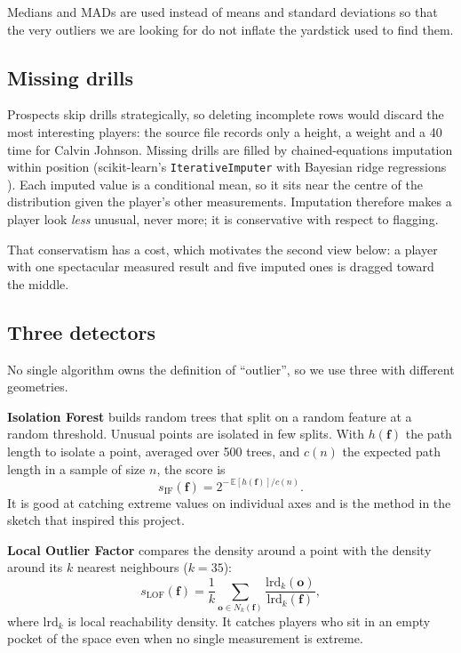 \documentclass[11pt]{article}
\begin{document}
Medians and MADs are used instead of means and standard deviations so that the very outliers we are looking for do not inflate the yardstick used to find them.

\subsection{Missing drills}

Prospects skip drills strategically, so deleting incomplete rows would discard the most interesting players: the source file records only a height, a weight and a 40 time for Calvin Johnson. Missing drills are filled by chained-equations imputation \cite{mice} within position (scikit-learn's \texttt{IterativeImputer} with Bayesian ridge regressions \cite{sklearn}). Each imputed value is a conditional mean, so it sits near the centre of the distribution given the player's other measurements. Imputation therefore makes a player look \emph{less} unusual, never more; it is conservative with respect to flagging.

That conservatism has a cost, which motivates the second view below: a player with one spectacular measured result and five imputed ones is dragged toward the middle.

\subsection{Three detectors}

No single algorithm owns the definition of ``outlier'', so we use three with different geometries.

\textbf{Isolation Forest} \cite{iforest} builds random trees that split on a random feature at a random threshold. Unusual points are isolated in few splits. With $h(\mathbf{f})$ the path length to isolate a point, averaged over 500 trees, and $c(n)$ the expected path length in a sample of size $n$, the score is
\begin{equation}
s_{\mathrm{IF}}(\mathbf{f}) = 2^{-\,\mathbb{E}[h(\mathbf{f})]/c(n)} .
\end{equation}
It is good at catching extreme values on individual axes and is the method in the sketch that inspired this project.

\textbf{Local Outlier Factor} \cite{lof} compares the density around a point with the density around its $k$ nearest neighbours ($k=35$):
\begin{equation}
s_{\mathrm{LOF}}(\mathbf{f}) = \frac{1}{k}\sum_{\mathbf{o}\in N_k(\mathbf{f})}\frac{\mathrm{lrd}_k(\mathbf{o})}{\mathrm{lrd}_k(\mathbf{f})},
\end{equation}
where $\mathrm{lrd}_k$ is local reachability density. It catches players who sit in an empty pocket of the space even when no single measurement is extreme.
\end{document}
